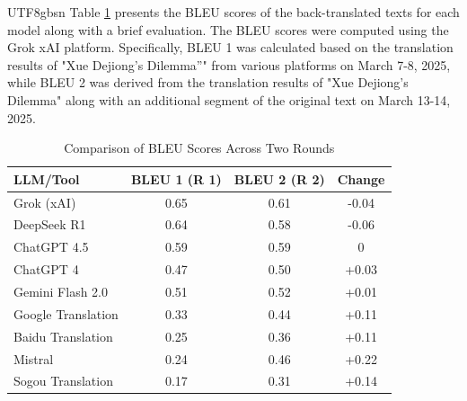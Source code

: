 \documentclass[conference]{IEEEtran}
\begin{document}
\begin{CJK*}{UTF8}{gbsn}
Table \ref{tab:bleu_comparison} presents the BLEU scores of the back-translated texts for each model along with a brief evaluation. The BLEU scores were computed using the Grok xAI platform. Specifically, BLEU 1 was calculated based on the translation results of "Xue Dejiong’s Dilemma”" from various platforms on March 7-8, 2025, while BLEU 2 was derived from the translation results of "Xue Dejiong’s Dilemma" along with an additional segment of the original text on March 13-14, 2025.

\begin{table}[h]
\centering
\caption{Comparison of BLEU Scores Across Two Rounds} %
\label{tab:bleu_comparison}
\begin{tabular}{lccc}
\toprule
\textbf{LLM/Tool}         & \textbf{BLEU 1 (R 1)} & \textbf{BLEU 2 (R 2)} & \textbf{Change} \\
\midrule
Grok (xAI)               & 0.65                     & 0.61                     & -0.04          \\
DeepSeek R1              & 0.64                     & 0.58                     & -0.06          \\
ChatGPT 4.5              & 0.59                     & 0.59                        & 0              \\
ChatGPT 4                & 0.47                     & 0.50                     & +0.03          \\
Gemini Flash 2.0         & 0.51                        & 0.52                     & +0.01              \\
Google Translation       & 0.33                     & 0.44                     & +0.11          \\
Baidu Translation        & 0.25                     & 0.36                     & +0.11          \\
Mistral                  & 0.24                     & 0.46                     & +0.22          \\
Sogou Translation        & 0.17                     & 0.31                     & +0.14          \\
\bottomrule
\end{tabular}
\end{table}


\end{CJK*}
\end{document}
